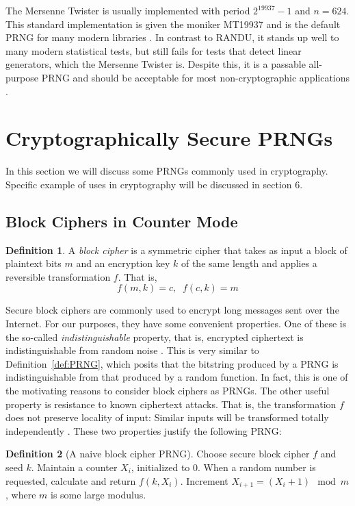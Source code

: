 \documentclass[titlepage]{article}
\theoremstyle{definition}
\newtheorem{definition}{Definition}[section]
\begin{document}
The Mersenne Twister is usually implemented with period $2^{19937}-1$ and $n = 624$. This standard implementation is given the moniker MT19937 and is the default PRNG for many modern libraries \cite{MTWiki}. In contrast to RANDU, it stands up well to many modern statistical tests, but still fails for tests that detect linear generators, which the Mersenne Twister is. Despite this, it is a passable all-purpose PRNG and should be acceptable for most non-cryptographic applications \cite{MTWiki}.

\section{Cryptographically Secure PRNGs}
In this section we will discuss some PRNGs commonly used in cryptography. Specific example of uses in cryptography will be discussed in section 6.

\subsection{Block Ciphers in Counter Mode}
\begin{definition}
A \textit{block cipher} is a symmetric cipher that takes as input a block of plaintext bits $m$ and an encryption key $k$ of the same length and applies a reversible transformation $f$. That is,
$$f(m,k) = c, \;\; f(c,k) = m$$ \cite{Textbook}
\end{definition}
Secure block ciphers are commonly used to encrypt long messages sent over the Internet. For our purposes, they have some convenient properties. One of these is the so-called \textit{indistinguishable} property, that is, encrypted ciphertext is indistinguishable from random noise \cite{NIST}. This is very similar to Definition~\ref{def:PRNG}, which posits that the bitstring produced by a PRNG is indistinguishable from that produced by a random function. In fact, this is one of the motivating reasons to consider block ciphers as PRNGs. The other useful property is resistance to known ciphertext attacks. That is, the transformation $f$ does not preserve locality of input: Similar inputs will be transformed totally independently \cite{NIST}. These two properties justify the following PRNG:

\begin{definition}[A naive block cipher PRNG]
Choose secure block cipher $f$ and seed $k$. Maintain a counter $X_i$, initialized to 0. When a random number is requested, calculate and return $f(k,X_i)$. Increment $X_{i+1} = (X_i + 1) \!\!\!\mod m$, where $m$ is some large modulus.
\end{definition}
\end{document}
